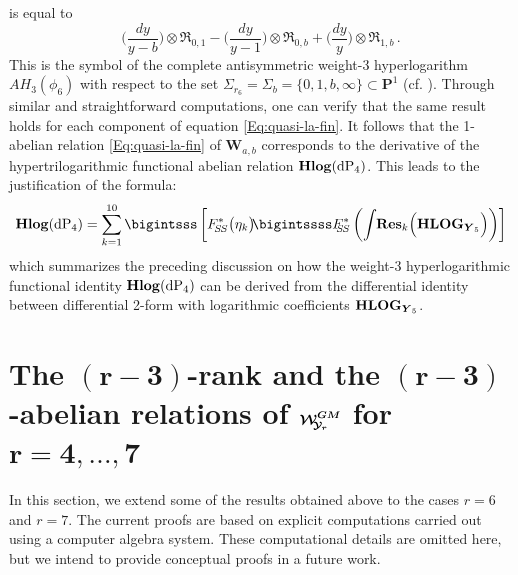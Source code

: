 \documentclass[11pt]{amsart}
\begin{document}
is equal to 
$$
\Big(\frac{dy}{y-b}\Big)\otimes 
{\mathfrak R}_{0,1}
-
\Big(\frac{dy}{y-1}\Big)\otimes 
{\mathfrak R}_{0,b}
+
\Big(\frac{dy}{y}\Big)\otimes 
{\mathfrak R}_{1,b}\,.
$$
This is the symbol of the complete antisymmetric weight-3 hyperlogarithm ${AH}_3(\phi_6)$ with respect to the set $\Sigma_{r_6}=\Sigma_b = \{0,1,b,\infty\} \subset {\mathbf P}^1$ (cf. \cite[\S2.1.3]{CP}). Through similar and straightforward computations, one can verify that the same result holds for each component of equation \eqref{Eq:quasi-la-fin}. It follows that the 1-abelian relation
\eqref{Eq:quasi-la-fin} 
 of $\boldsymbol{W}_{a,b}$ corresponds to the derivative of the hypertrilogarithmic  functional abelian relation ${\bf Hlog}({\rm dP}_4)$. This leads to the justification of the formula:
\begin{equation}
\label{Eq:la-fin}
{{\bf Hlog}({\rm dP}_4)}=\sum_{k=1}^{10} \bigintsss 
\left[
F_{\hspace{-0.05cm} 
S\hspace{-0.03cm}S}^*\big(
\eta_k 
\big) 
\hspace{-0.08cm}
\bigintssss    F_{\hspace{-0.05cm} 
\hspace{-0.08cm}
S\hspace{-0.03cm}S}^*\left( 
\hspace{-0.0cm}
\int
  \hspace{-0.08cm} {\bf Res}_{k}\Big(
{\bf HLOG}_{\boldsymbol{Y}_5}
 \Big)\right)\right]
\end{equation}
which summarizes the preceding discussion on how the weight-3 hyperlogarithmic functional identity ${\bf Hlog}({\rm dP}_4)$ can be derived 
from the differential identity between differential 2-form with logarithmic coefficients ${\bf HLOG}_{\boldsymbol{Y}_5}$. 




\section{\bf The 
$\boldsymbol{(r-3)}$-rank  and the
$\boldsymbol{(r-3)}$-abelian relations  
of $\boldsymbol{\boldsymbol{\mathcal W}^{GM}_{\hspace{-0.1cm} {\mathcal Y}_r}}$ for $\boldsymbol{r=4,\ldots,7}$}
\label{SS:r=6,7}
In this section, we extend some of the results obtained above to the cases $r = 6$ and $r = 7$. The current proofs are based on explicit computations carried out using a computer algebra system. These computational details are omitted here, but we intend to provide conceptual proofs in a future work.
 
\end{document}
